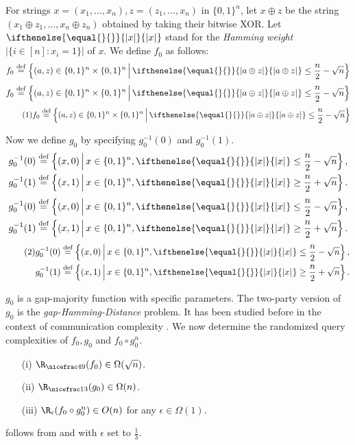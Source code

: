 \documentclass{toc}
\newcommand{\md}{\middle}
\newcommand{\malabel}[1]{\addtocounter{equation}{1}\tag{\theequation}\label{#1}}
\newcommand{\m}[2][]{%
\ifthenelse{\equal{}{#1}}%
{\begin{align*} #2 \end{align*}}%
{\ifthenelse{\eq<ual{P}{#1}}%
{\begingroup\allowdisplaybreaks\begin{align*} #2%
\end{align*}\endgroup}%
{\begin{align*} \malabel{#1} #2 \end{align*}}%
}%
}
\newcommand{\dr}{\nicefrac}
\newcommand{\sq}{\sqrt}
\newcommand{\sett}[2]{\ensuremath{\left\{#1\,\md|\,#2\right\}}}
\newcommand{\asO}[1]{O(#1)}
\newcommand{\asOm}[1]{\Omega(#1)}
\newcommand{\sz}[2][]{\ifthenelse{\equal{}{#1}}%
{\ensuremath{\left|#2\right|}}%
{\ensuremath{\left|#2\right|_{#1}}}}
\newcommand{\eps}{\epsilon}
\newcommand{\deq}{\stackrel{\textrm{def}}{=}}
\begin{document}
For strings $x=(x_1, \ldots, x_n), z=(z_1, \ldots, x_n)$ in $\{0,1\}^n$, let $x\oplus z$ be the string $(x_1 \oplus z_1, \ldots, x_n \oplus z_n)$ obtained by taking their bitwise XOR. Let $\sz{x}$ stand for the \emph{Hamming weight} $|{\{i \in [n]: x_i =1\}}|$ of $x$. We define $f_0$ as follows:
\m{
  f_0\deq\sett {(a,z) \in \{0,1\}^n \times \{0,1\}^n}{\sz{a\oplus z}\le\frac n2-\sq n}
}
Now we define $g_0$ by specifying $g_0^{-1}(0)$ and $g_0^{-1}(1)$.
\m{
&g_0^{-1}(0)\deq\sett {(x,0)}{x \in \{0,1\}^n, \sz x\le\frac n2-\sq n}, \\
&g_0^{-1}(1)\deq\sett{(x,1)}{x \in \{0,1\}^n, \sz x\ge\frac n2+\sq n}.
}
$g_0$ is a gap-majority function with specific parameters. The two-party version of $g_0$ is the \emph{gap-Hamming-Distance} problem. It has been studied before in the context of communication complexity \cite{CR11_An_O}.
We now determine the randomized query complexities of $f_0, g_0$ and $f_0 \circ g_0^n$.
\begin{claim}
\label{matchingex}
\begin{enumerate}
\item[(i)] $\R_{\dr49}(f_0)\in\asOm{\sq n}$.
\item[(ii)] $\R_{\dr13}(g_0)\in\asOm n$.
\item[(iii)] $\R_\eps(f_0\circ g_0^n)\in\asO{n}$ for any $\eps\in \asOm1$.
\end{enumerate}
\end{claim}
 follows from  and  with $\eps$ set to $\frac 13$.
\end{document}
